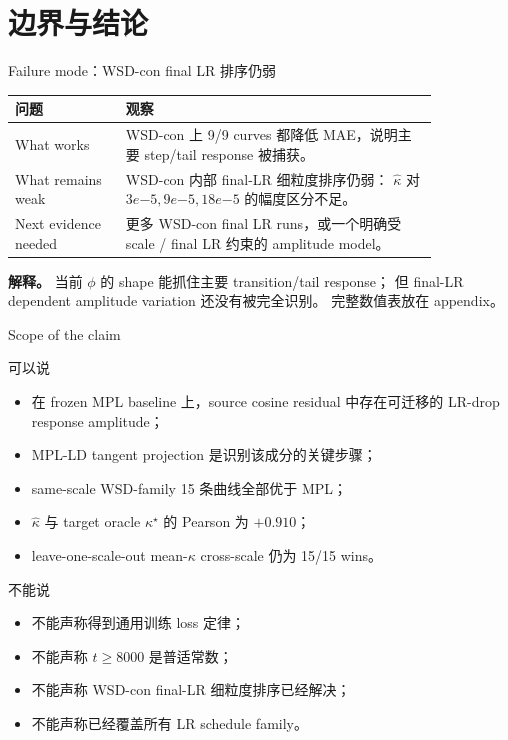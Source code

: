 \documentclass[9pt,aspectratio=169,fontset=fandol]{ctexbeamer}
\newcommand{\tightlist}{\setlength{\itemsep}{2pt}\setlength{\parskip}{0pt}}
\begin{document}
\section{边界与结论}

\begin{frame}{Failure mode：WSD-con final LR 排序仍弱}
\small
\begin{center}
\begin{tabular}{L{0.22\linewidth}L{0.62\linewidth}}
\toprule
问题 & 观察\\
\midrule
What works &
WSD-con 上 9/9 curves 都降低 MAE，说明主要 step/tail response 被捕获。\\
\addlinespace
What remains weak &
WSD-con 内部 final-LR 细粒度排序仍弱：
\(\widehat\kappa\) 对 \(3e{-5},9e{-5},18e{-5}\) 的幅度区分不足。\\
\addlinespace
Next evidence needed &
更多 WSD-con final LR runs，或一个明确受 scale / final LR 约束的 amplitude model。\\
\bottomrule
\end{tabular}
\end{center}
\vfill
\textbf{解释。}
当前 \(\phi\) 的 shape 能抓住主要 transition/tail response；
但 final-LR dependent amplitude variation 还没有被完全识别。
完整数值表放在 appendix。
\end{frame}

\begin{frame}{Scope of the claim}
\small
\begin{block}{可以说}
\begin{itemize}\tightlist
\item 在 frozen MPL baseline 上，source cosine residual 中存在可迁移的 LR-drop response amplitude；
\item MPL-LD tangent projection 是识别该成分的关键步骤；
\item same-scale WSD-family 15 条曲线全部优于 MPL；
\item \(\widehat\kappa\) 与 target oracle \(\kappa^\star\) 的 Pearson 为 \(+0.910\)；
\item leave-one-scale-out mean-\(\kappa\) cross-scale 仍为 15/15 wins。
\end{itemize}
\end{block}
\vfill
\begin{alertblock}{不能说}
\begin{itemize}\tightlist
\item 不能声称得到通用训练 loss 定律；
\item 不能声称 \(t\ge8000\) 是普适常数；
\item 不能声称 WSD-con final-LR 细粒度排序已经解决；
\item 不能声称已经覆盖所有 LR schedule family。
\end{itemize}
\end{alertblock}
\end{frame}
\end{document}
